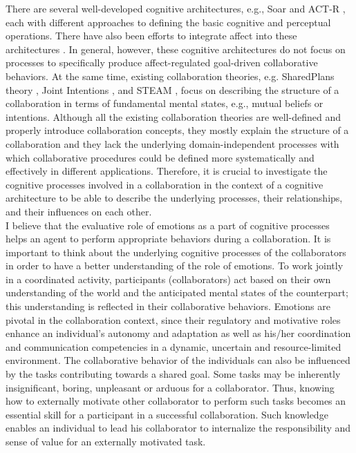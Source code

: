 \documentclass[a4paper, 10pt]{article}
\begin{document}
\begin{small}
There are several well-developed
cognitive architectures, e.g., Soar \cite{laird:soar} and ACT-R
\cite{anderson:act-r}, each with different approaches to defining the basic
cognitive and perceptual operations. There have also been efforts to integrate
affect into these architectures \cite{marinier:behavior-emotion}. In general,
however, these cognitive architectures do not focus on processes to specifically
produce affect-regulated goal-driven collaborative behaviors. At the same time,
existing collaboration theories, e.g. SharedPlans theory
\cite{grosz:plans-discourse}, Joint Intentions \cite{cohen:teamwork}, and STEAM
\cite{tambe:flexible-teamwork}, focus on describing the structure of a
collaboration in terms of fundamental mental states, e.g., mutual beliefs or
intentions. Although all the existing collaboration theories are well-defined
and properly introduce collaboration concepts, they mostly explain the structure
of a collaboration and they lack the underlying domain-independent processes
with which collaborative procedures could be defined more systematically and
effectively in different applications. Therefore, it is crucial to investigate
the cognitive processes involved in a collaboration in the context of a
cognitive architecture to be able to describe the underlying processes, their
relationships, and their influences on each other.\\

I believe that the evaluative role of emotions as a part of cognitive processes
helps an agent to perform appropriate behaviors during a collaboration. It is
important to think about the underlying cognitive processes of the collaborators
in order to have a better understanding of the role of emotions. To work jointly
in a coordinated activity, participants (collaborators) act based on their own
understanding of the world and the anticipated mental states of the counterpart;
this understanding is reflected in their collaborative behaviors. Emotions are
pivotal in the collaboration context, since their regulatory and motivative
roles enhance an individual's autonomy and adaptation as well as his/her
coordination and communication competencies in a dynamic, uncertain and
resource-limited environment. The collaborative behavior of the individuals can
also be influenced by the tasks contributing towards a shared goal. Some tasks
may be inherently insignificant, boring, unpleasant or arduous for a
collaborator. Thus, knowing how to externally motivate other collaborator to
perform such tasks becomes an essential skill for a participant in a successful
collaboration. Such knowledge enables an individual to lead his collaborator to
internalize the responsibility and sense of value for an externally motivated
task.


\end{small}
\end{document}
